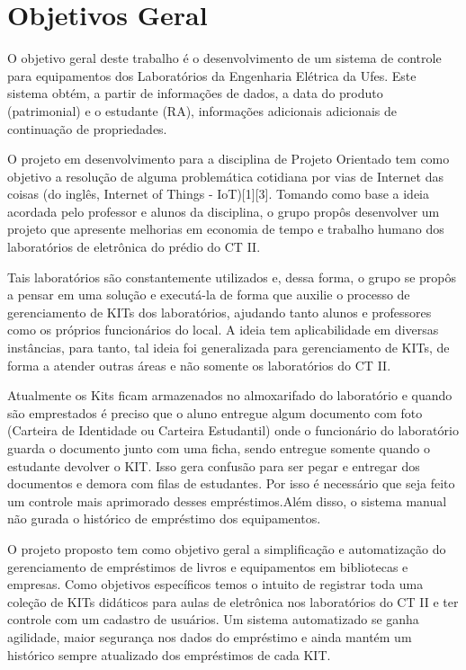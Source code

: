 \vspace{-42pt}
\section[Objetivos Geral]{Objetivos Geral}
O objetivo geral deste trabalho é o desenvolvimento de um sistema de controle para equipamentos dos Laboratórios da Engenharia Elétrica da Ufes. Este sistema obtém, a partir de informações de dados, a data do produto (patrimonial) e o estudante (RA), informações adicionais adicionais de continuação de propriedades.

O projeto em desenvolvimento para a disciplina de Projeto Orientado tem como objetivo a resolução de alguma problemática cotidiana por vias de Internet das coisas (do inglês, Internet of Things - IoT)[1][3]. Tomando como base a ideia acordada pelo professor e alunos da disciplina, o grupo propôs desenvolver um projeto que apresente melhorias em economia de tempo e trabalho humano dos laboratórios de eletrônica do prédio do CT II. 

Tais laboratórios são constantemente utilizados e, dessa forma, o grupo se propôs a pensar em uma solução e executá-la de forma que auxilie o processo de gerenciamento de KITs dos laboratórios, ajudando tanto alunos e professores como os próprios funcionários do local. A ideia tem aplicabilidade em diversas instâncias, para tanto, tal ideia foi generalizada para gerenciamento de KITs, de forma a atender outras áreas e não somente os laboratórios do CT II. 

Atualmente os Kits ficam armazenados no almoxarifado do laboratório e quando são emprestados é preciso que o aluno entregue algum documento com foto (Carteira de Identidade ou Carteira Estudantil) onde o funcionário do laboratório guarda o documento junto com uma ficha, sendo entregue somente quando o estudante devolver o KIT. Isso gera confusão para ser pegar e entregar dos documentos e demora com filas de estudantes. Por isso é necessário que seja feito um controle mais aprimorado desses empréstimos.Além disso, o sistema manual não gurada o histórico de empréstimo dos equipamentos. 

O projeto proposto tem como objetivo geral a simplificação e automatização do gerenciamento de empréstimos de livros e equipamentos em bibliotecas e empresas. Como objetivos específicos temos o intuito de registrar toda uma coleção de KITs didáticos para aulas de eletrônica nos laboratórios do CT II e ter controle com um cadastro de usuários.
Um sistema automatizado se ganha agilidade, maior segurança nos dados do empréstimo e ainda mantém um histórico sempre atualizado dos empréstimos de cada KIT.


